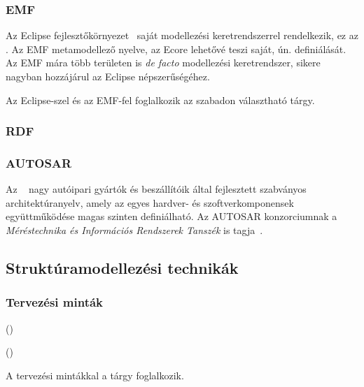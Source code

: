 \subsubsection{EMF}

Az Eclipse fejlesztőkörnyezet~\cite{eclipse} saját modellezési keretrendszerrel rendelkezik, ez az . Az EMF metamodellező nyelve, az Ecore lehetővé teszi saját, ún.  definiálását. Az EMF mára több területen is \emph{de facto} modellezési keretrendszer, sikere nagyban hozzájárul az Eclipse népszerűségéhez.

Az Eclipse-szel és az EMF-fel foglalkozik az \eat szabadon választható tárgy.

\subsubsection{RDF}


\subsubsection{AUTOSAR}

Az ~\cite{autosar} nagy autóipari gyártók és beszállítóik által fejlesztett szabványos architektúranyelv, amely az egyes hardver- és szoftverkomponensek együttműködése magas szinten definiálható. Az AUTOSAR konzorciumnak a \emph{Méréstechnika és Információs Rendszerek Tanszék} is tagja~\cite{autosar-attendees}.

\subsection{Struktúramodellezési technikák}



\subsubsection{Tervezési minták}


 () 

 ()



A tervezési mintákkal a \sznikak tárgy foglalkozik.

